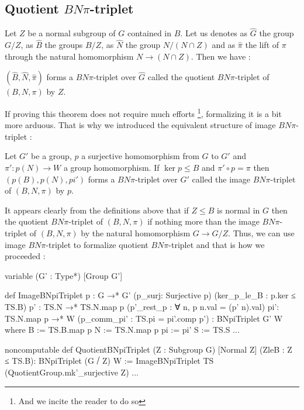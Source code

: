 \subsection{Quotient $BN\pi$-triplet}

    Let $Z$ be a normal subgroup of $G$ contained in $B$. Let us denotes as $\hat{G}$ the group $G /Z$, as $\hat{B}$ the groups $B/{Z}$, as $\hat{N}$ the group $N/(N\cap Z)$ and as $\hat{\pi}$ the lift of $\pi$ through the natural homomorphism $N \to (N \cap Z)$. Then we have :

\begin{definition} \label{def:quotBN}
$\left( \hat{B},\hat{N},\hat{\pi} \right)$ forms a $BN\pi$-triplet over $\hat{G}$ called the quotient $BN\pi$-triplet of $\left( B,N, \pi \right)$ by $Z$.
\end{definition}

 If proving this theorem does not require much efforts \footnote{And we incite the reader to do so}, formalizing it is a bit more arduous. That is why we introduced the equivalent structure of image $BN\pi$-triplet :

\begin{definition}
Let $G'$ be a group, $p$ a surjective homomorphism from $G$ to $G'$ and $\pi': p(N) \to W$ a group homomorphism. If $\ker p \le B$ and $\pi' \circ p = \pi$ then $\left( p(B), p(N), pi' \right)$  forms a $BN\pi$-triplet over $G'$ called the image $BN\pi$-triplet of $(B,N, \pi)$ by $p$.
\end{definition}

It appears clearly from the definitions above that if $Z \le B$ is normal in $G$ then the quotient $BN\pi$-triplet of $\left( B,N, \pi \right)$ if nothing more than the image $BN\pi$-triplet of $\left( B,N, \pi \right)$ by the natural homomorphism $G \to G / Z$. Thus, we can use image $BN\pi$-triplet to formalize quotient $BN\pi$-triplet and that is how we proceeded :

\begin{leancode}
variable (G' : Type*) [Group G']

def ImageBNpiTriplet {p : G →* G'} (p_surj: Surjective p) (ker_p_le_B : p.ker ≤ TS.B)
    {p' : TS.N →* TS.N.map p} (p'_rest_p : ∀ n, p n.val = (p' n).val) {pi': TS.N.map p →* W}
      (p_comm_pi' : TS.pi = pi'.comp p') : BNpiTriplet G' W where
  B := TS.B.map p
  N := TS.N.map p
  pi := pi'
  S := TS.S
  ...

noncomputable
def QuotientBNpiTriplet (Z : Subgroup G) [Normal Z] (ZleB : Z ≤ TS.B): BNpiTriplet (G ⧸ Z) W :=
    ImageBNpiTriplet TS (QuotientGroup.mk'_surjective Z) ...
\end{leancode}

